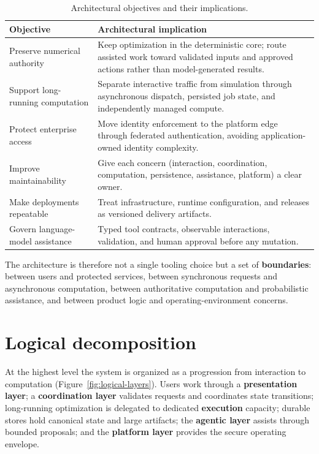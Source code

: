 \begin{table}[H]
  \centering
  \begin{tabularx}{\linewidth}{@{}
      >{\raggedright\arraybackslash}p{4.3cm}
      >{\raggedright\arraybackslash}X @{}}
    \toprule
    \textbf{Objective} & \textbf{Architectural implication} \\
    \midrule
    Preserve numerical authority & Keep optimization in the deterministic core;
      route assisted work toward validated inputs and approved actions rather than
      model-generated results. \\
    \addlinespace
    Support long-running computation & Separate interactive traffic from
      simulation through asynchronous dispatch, persisted job state, and
      independently managed compute. \\
    \addlinespace
    Protect enterprise access & Move identity enforcement to the platform edge
      through federated authentication, avoiding application-owned identity
      complexity. \\
    \addlinespace
    Improve maintainability & Give each concern (interaction, coordination,
      computation, persistence, assistance, platform) a clear owner. \\
    \addlinespace
    Make deployments repeatable & Treat infrastructure, runtime configuration, and
      releases as versioned delivery artifacts. \\
    \addlinespace
    Govern language-model assistance & Typed tool contracts, observable
      interactions, validation, and human approval before any mutation. \\
    \bottomrule
  \end{tabularx}
  \caption{Architectural objectives and their implications.}
  \label{tab:objectives}
\end{table}

The architecture is therefore not a single tooling choice but a set of
\textbf{boundaries}: between users and protected services, between synchronous
requests and asynchronous computation, between authoritative computation and
probabilistic assistance, and between product logic and operating-environment
concerns.

\section{Logical decomposition}
\label{sec:logical}

At the highest level the system is organized as a progression from interaction to
computation (Figure~\ref{fig:logical-layers}). Users work through a
\textbf{presentation layer}; a
\textbf{coordination layer} validates requests and coordinates state transitions;
long-running optimization is delegated to dedicated \textbf{execution} capacity;
durable stores hold canonical state and large artifacts; the \textbf{agentic
layer} assists through bounded proposals; and the \textbf{platform layer} provides
the secure operating envelope.

